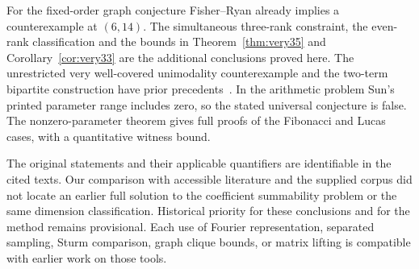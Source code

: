 \documentclass[11pt,a4paper]{article}
\theoremstyle{remark}\newtheorem{remark}[theorem]{Remark}
\numberwithin{equation}{section}
\begin{document}
For the fixed-order graph conjecture Fisher--Ryan already implies a counterexample at $(6,14)$. The simultaneous three-rank constraint, the even-rank classification and the bounds in Theorem~\ref{thm:very35} and Corollary~\ref{cor:very33} are the additional conclusions proved here. The unrestricted very well-covered unimodality counterexample and the two-term bipartite construction have prior precedents~\cite{Baker,BK}. In the arithmetic problem Sun's printed parameter range includes zero, so the stated universal conjecture is false. The nonzero-parameter theorem gives full proofs of the Fibonacci and Lucas cases, with a quantitative witness bound.

The original statements and their applicable quantifiers are identifiable in the cited texts. Our comparison with accessible literature and the supplied corpus did not locate an earlier full solution to the coefficient summability problem or the same dimension classification. Historical priority for these conclusions and for the method remains provisional. Each use of Fourier representation, separated sampling, Sturm comparison, graph clique bounds, or matrix lifting is compatible with earlier work on those tools.

\appendix
\end{document}
